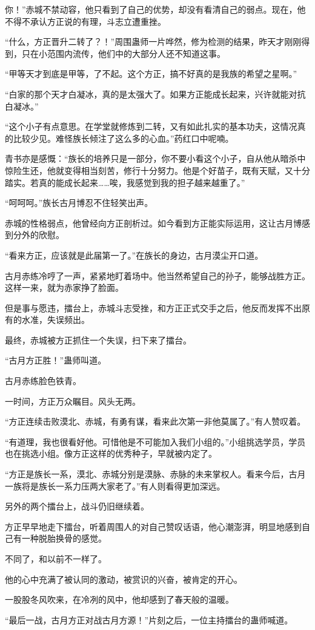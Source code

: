 \begin{this_body}
你！”赤城不禁动容，他只看到了自己的优势，却没有看清自己的弱点。现在，他不得不承认方正说的有理，斗志立遭重挫。

“什么，方正晋升二转了？！”周围蛊师一片哗然，修为检测的结果，昨天才刚刚得到，只在小范围内流传，他们中的大部分人还不知道这事。

“甲等天才到底是甲等，了不起。这个方正，搞不好真的是我族的希望之星啊。”

“白家的那个天才白凝冰，真的是太强大了。如果方正能成长起来，兴许就能对抗白凝冰。”

“这个小子有点意思。在学堂就修炼到二转，又有如此扎实的基本功夫，这情况真的比较少见。难怪族长倾注了这么多的心血。”药红口中呢喃。

青书亦是感慨：“族长的培养只是一部分，你不要小看这个小子，自从他从暗杀中惊险生还，他就变得相当刻苦，修行十分努力。他是个好苗子，既有天赋，又十分踏实。若真的能成长起来……唉，我感觉到我的担子越来越重了。”

“呵呵呵。”族长古月博忍不住轻笑出声。

赤城的性格弱点，他曾经向方正剖析过。如今看到方正能实际运用，这让古月博感到分外的欣慰。

“看来方正，应该就是此届第一了。”在族长的身边，古月漠尘开口道。

古月赤练冷哼了一声，紧紧地盯着场中。他当然希望自己的孙子，能够战胜方正。这样一来，就为赤家挣了脸面。

但是事与愿违，擂台上，赤城斗志受挫，和方正正式交手之后，他反而发挥不出原有的水准，失误频出。

最终，赤城被方正抓住一个失误，扫下来了擂台。

“古月方正胜！”蛊师叫道。

古月赤练脸色铁青。

一时间，方正万众瞩目。风头无两。

“方正连续击败漠北、赤城，有勇有谋，看来此次第一非他莫属了。”有人赞叹着。

“有道理，我也很看好他。可惜他是不可能加入我们小组的。”小组挑选学员，学员也在挑选小组。像方正这样的优秀种子，早就被内定了。

“方正是族长一系，漠北、赤城分别是漠脉、赤脉的未来掌权人。看来今后，古月一族将是族长一系力压两大家老了。”有人则看得更加深远。

另外的两个擂台上，战斗仍旧继续着。

方正早早地走下擂台，听着周围人的对自己赞叹话语，他心潮澎湃，明显地感到自己有一种脱胎换骨的感觉。

不同了，和以前不一样了。

他的心中充满了被认同的激动，被赏识的兴奋，被肯定的开心。

一股股冬风吹来，在冷冽的风中，他却感到了春天般的温暖。

“最后一战，古月方正对战古月方源！”片刻之后，一位主持擂台的蛊师喊道。

\end{this_body}

